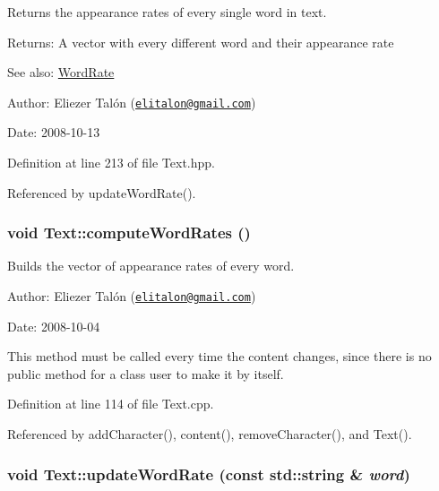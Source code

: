 Returns the appearance rates of every single word in text. 

\begin{Desc}
\item[Returns:]A vector with every different word and their appearance rate\end{Desc}
\begin{Desc}
\item[See also:]\hyperlink{_word_rate_8hpp_6820e401b512f1cdb3f95171db9c67b9}{WordRate}\end{Desc}
\begin{Desc}
\item[Author:]Eliezer Talón (\href{mailto:elitalon@gmail.com}{\tt elitalon@gmail.com}) \end{Desc}
\begin{Desc}
\item[Date:]2008-10-13 \end{Desc}


Definition at line 213 of file Text.hpp.

Referenced by updateWordRate().\hypertarget{class_text_8239e13039bcc1c713f66f1236693706}{
\subsubsection[computeWordRates]{\setlength{\rightskip}{0pt plus 5cm}void Text::computeWordRates ()}}
\label{class_text_8239e13039bcc1c713f66f1236693706}


Builds the vector of appearance rates of every word. 

\begin{Desc}
\item[Author:]Eliezer Talón (\href{mailto:elitalon@gmail.com}{\tt elitalon@gmail.com}) \end{Desc}
\begin{Desc}
\item[Date:]2008-10-04\end{Desc}
This method must be called every time the content changes, since there is no public method for a class user to make it by itself. 

Definition at line 114 of file Text.cpp.

Referenced by addCharacter(), content(), removeCharacter(), and Text().\hypertarget{class_text_5ab8f9bfa566de537a167991fe10eff5}{
\subsubsection[updateWordRate]{\setlength{\rightskip}{0pt plus 5cm}void Text::updateWordRate (const std::string \& {\em word})}}
\label{class_text_5ab8f9bfa566de537a167991fe10eff5}


